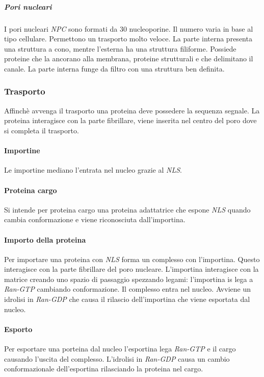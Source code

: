 				\subparagraph{Pori nucleari}
				I pori nucleari \emph{NPC} sono formati da $30$ nucleoporine.
				Il numero varia in base al tipo cellulare.
				Permettono un trasporto molto veloce.
				La parte interna presenta una struttura a cono, mentre l'esterna ha una struttura filiforme.
				Possiede proteine che la ancorano alla membrana, proteine strutturali e che delimitano il canale.
				La parte interna funge da filtro con una struttura ben definita.
		
		\subsubsection{Trasporto}
		Affinch\`e avvenga il trasporto una proteina deve possedere la sequenza segnale.
		La proteina interagisce con la parte fibrillare, viene inserita nel centro del poro dove si completa il trasporto.

			\paragraph{Importine}
			Le importine mediano l'entrata nel nucleo grazie al \emph{NLS}.

			\paragraph{Proteina cargo}
			Si intende per proteina cargo una proteina adattatrice che espone \emph{NLS} quando cambia conformazione e viene riconosciuta dall'importina.

			\paragraph{Importo della proteina}
			Per importare una proteina con \emph{NLS} forma un complesso con l'importina.
			Questo interagisce con la parte fibrillare del poro nucleare.
			L'importina interagisce con la matrice creando uno spazio di passaggio spezzando legami: l'importina is lega a \emph{Ran-GTP} cambiando conformazione.
			Il complesso entra nel nucleo.
			Avviene un idrolisi in \emph{Ran-GDP} che causa il rilascio dell'importina che viene esportata dal nucleo.

			\paragraph{Esporto}
			Per esportare una porteina dal nucleo l'esportina lega \emph{Ran-GTP} e il cargo causando l'uscita del complesso.
			L'idrolisi in \emph{Ran-GDP} causa un cambio conformazionale dell'esportina rilasciando la proteina nel cargo.

